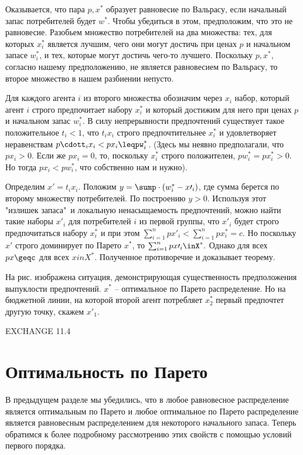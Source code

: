 Оказывается, что пара $p, x^*$ образует равновесие по Вальрасу, если начальный
запас потребителей будет $w^*$. Чтобы убедиться в этом, предположим, что это не равновесие.
Разобьем множество потребителей на два множества: тех, для которых $x^*_i$ является лучшим,
чего они могут достичь при ценах $p$ и начальном запасе $w^*_i$, и тех, которые могут достичь
чего-то лучшего. Поскольку $p, x^*$, согласно нашему предположению, не является равновесием
по Вальрасу, то второе множество в нашем разбиении непусто.

Для каждого агента $i$ из второго множества обозначим через $x_i$ набор, который
агент $i$ строго предпочитает набору $x^*_i$ и который достижим для него при ценах
$p$ и начальном запас $w^*_i$. В силу непрерывности предпочтений существует
такое положительное $t_i<1$, что $t_ix_i$ строго предпочтительнее $x^*_i$ и
удовлетворяет неравенствам $p\cdott_ix_i<px_i\leqpw^*_i$. (Здесь мы неявно предполагали,
что $px_i>0$. Если же  $px_i=0$, то, поскольку $x^*_i$ строго положителен,
$pw^*_i=px^*_i>0$. Но тогда $px_i<pw^*_i$, что собственно нам и нужно).

Определим $x\prime=t_ix_i$. Положим $y=\sump\cdot(w^*_i-x\prime_i)$, где сумма берется по
второму множеству потребителей. По построению $y>0$. Используя этот "излишек запаса"\, и
локальную ненасыщаемость предпочтений, можно найти такие наборы $x\prime_i$ для потребителей
$i$ из первой группы, что $x\prime_i$ будет строго предпочитаться набору $x^*_i$ и при этом
$\sum^n_{i=1}px\prime_i<\sum^n_{i=1}px^*_i=c$. Но поскольку $x\prime$ строго доминирует по
Парето $x^*$, то $\sum^n_{i=1}px\prime_i\inX^*.$ Однако для всех $px\geqc$ для всех $xinX^*$.
Полученное противоречие и доказывает теорему.

На рис.      изображена ситуация, демонстрирующая существенность
предположения выпуклости предпочтений. $x^*$ -- оптимальное по Парето
распределение. Но на бюджетной линии, на которой второй агент потребляет
$x^*_2$ первый предпочтет другую точку, скажем $x\prime_1$.

EXCHANGE 11.4

\section*{Оптимальность по Парето }

В предыдущем разделе мы убедились, что в любое равновесное распределение является
оптимальным по Парето и любое оптимальное по Парето распределение является
равновесным распределением для некоторого начального запаса. Теперь обратимся к
более подробному рассмотрению этих свойств с помощью условий первого порядка.

